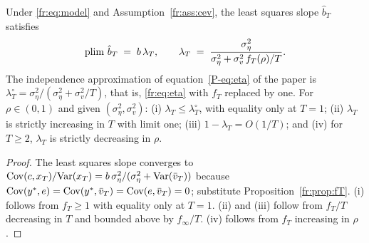 \begin{proposition}
\label{fr:prop:eta}
Under \eqref{fr:eq:model} and Assumption~\ref{fr:ass:cev}, the least
squares slope $\hat b_T$ satisfies
\begin{equation}
\operatorname{plim}\,\hat b_T \;=\; b\,\lambda_T, \qquad
\lambda_T \;=\; \frac{\sigma^2_\eta}{\sigma^2_\eta + \sigma^2_v\, f_T(\rho)/T}.
\label{fr:eq:eta}
\end{equation}
The independence approximation of equation~\eqref{P-eq:eta} of the paper
is $\lambda^{\circ}_T = \sigma^2_\eta/(\sigma^2_\eta + \sigma^2_v/T)$, that is,
\eqref{fr:eq:eta} with $f_T$ replaced by one. For $\rho \in (0,1)$ and
given $(\sigma^2_\eta, \sigma^2_v)$:
(i) $\lambda_T \le \lambda^{\circ}_T$, with equality only at $T = 1$;
(ii) $\lambda_T$ is strictly increasing in $T$ with limit one;
(iii) $1 - \lambda_T = O(1/T)$; and
(iv) for $T \ge 2$, $\lambda_T$ is strictly decreasing in $\rho$.
\end{proposition}

\begin{proof}
The least squares slope converges to $\mathrm{Cov}(c, x_T)/\mathrm{Var}(x_T) =
b\,\sigma^2_\eta/(\sigma^2_\eta + \mathrm{Var}(\bar v_T))$ because
$\mathrm{Cov}(y^*, e) = \mathrm{Cov}(y^*, \bar v_T) = \mathrm{Cov}(e, \bar v_T) = 0$;
substitute Proposition~\ref{fr:prop:fT}. (i) follows from $f_T \ge 1$ with
equality only at $T = 1$. (ii) and (iii) follow from $f_T/T$ decreasing
in $T$ and bounded above by $f_\infty/T$. (iv) follows from $f_T$
increasing in $\rho$.
\end{proof}

